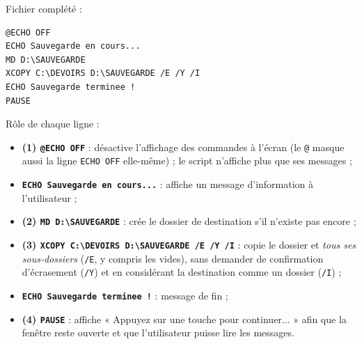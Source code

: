 \documentclass[11pt]{article}
\begin{document}
\begin{corrige}
Fichier complété :
\begin{lstlisting}
@ECHO OFF
ECHO Sauvegarde en cours...
MD D:\SAUVEGARDE
XCOPY C:\DEVOIRS D:\SAUVEGARDE /E /Y /I
ECHO Sauvegarde terminee !
PAUSE
\end{lstlisting}
Rôle de chaque ligne :
\begin{itemize}
  \item \textbf{(1) \texttt{@ECHO OFF}} : désactive l'affichage des commandes à l'écran (le \texttt{@} masque aussi la ligne \texttt{ECHO OFF} elle-même) ; le script n'affiche plus que ses messages ;
  \item \textbf{\texttt{ECHO Sauvegarde en cours...}} : affiche un message d'information à l'utilisateur ;
  \item \textbf{(2) \texttt{MD D:\textbackslash SAUVEGARDE}} : crée le dossier de destination s'il n'existe pas encore ;
  \item \textbf{(3) \texttt{XCOPY C:\textbackslash DEVOIRS D:\textbackslash SAUVEGARDE /E /Y /I}} : copie le dossier et \emph{tous ses sous-dossiers} (\texttt{/E}, y compris les vides), sans demander de confirmation d'écrasement (\texttt{/Y}) et en considérant la destination comme un dossier (\texttt{/I}) ;
  \item \textbf{\texttt{ECHO Sauvegarde terminee !}} : message de fin ;
  \item \textbf{(4) \texttt{PAUSE}} : affiche « Appuyez sur une touche pour continuer... » afin que la fenêtre reste ouverte et que l'utilisateur puisse lire les messages.
\end{itemize}
\end{corrige}
\end{document}
